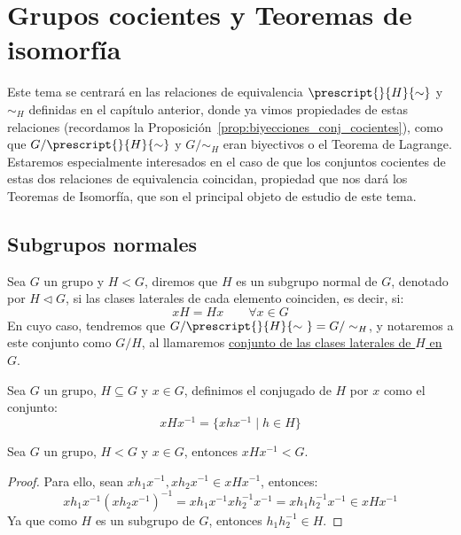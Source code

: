 \chapter{Grupos cocientes y Teoremas de isomorfía}
Este tema se centrará en las relaciones de equivalencia $\prescript{}{H}{\sim}$ y $\sim_H$ definidas en el capítulo anterior, donde ya vimos propiedades de estas relaciones (recordamos la Proposición~\ref{prop:biyecciones_conj_cocientes}), como que $G/\prescript{}{H}{\sim}$ y $G/\sim_H$ eran biyectivos o el Teorema de Lagrange. Estaremos especialmente interesados en el caso de que los conjuntos cocientes de estas dos relaciones de equivalencia coincidan, propiedad que nos dará los Teoremas de Isomorfía, que son el principal objeto de estudio de este tema.

\section{Subgrupos normales}
\begin{definicion}
    Sea $G$ un grupo y $H<G$, diremos que $H$ es un subgrupo normal de $G$, denotado por $H \lhd G$, si las clases laterales de cada elemento coinciden, es decir, si:
    \begin{equation*}
        xH = Hx \qquad \forall x\in G
    \end{equation*}
    En cuyo caso, tendremos que $G/\prescript{}{H}{\sim\ } = G/\sim_H$, y notaremos a este conjunto como $G/H$, al llamaremos \underline{conjunto de las clases laterales de $H$ en $G$}. 
\end{definicion}

\begin{definicion}[Conjugado]
    Sea $G$ un grupo, $H\subseteq G$ y $x\in G$, definimos el conjugado de $H$ por $x$ como el conjunto:
    \begin{equation*}
        xHx^{-1} = \{xhx^{-1} \mid h\in H\}
    \end{equation*}
\end{definicion}

\begin{prop}
    Sea $G$ un grupo, $H<G$ y $x\in G$, entonces $xHx^{-1}< G$.
    \begin{proof}
        Para ello, sean $xh_1x^{-1}, xh_2x^{-1}\in xHx^{-1}$, entonces:
        \begin{equation*}
            xh_1x^{-1}{(xh_2x^{-1})}^{-1} = xh_1x^{-1}xh_2^{-1}x^{-1} = xh_1h_2^{-1}x^{-1} \in xHx^{-1}
        \end{equation*}
        Ya que como $H$ es un subgrupo de $G$, entonces $h_1h_2^{-1}\in H$.
    \end{proof}
\end{prop}~\\

